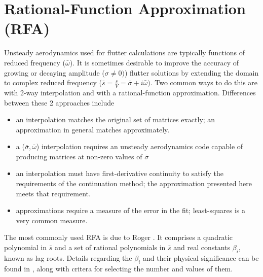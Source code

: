 \documentclass[10pt,openany,twoside]{book}
\numberwithin{equation}{section}   %
\begin{document}
\newpage
\section{Rational-Function Approximation (RFA)}\label{chap:RFA}
Unsteady aerodynamics used for flutter calculations are typically
functions of reduced frequency ($\bar{\omega}$). It is sometimes desirable
to improve the accuracy of growing or decaying amplitude ($\sigma \ne 0)$)
flutter solutions by extending the domain to complex reduced frequency
($\bar{s} = \frac{s}{V} = \bar{\sigma} + i\bar{\omega})$.
Two common ways to do this are with 2-way interpolation and
with a rational-function approximation. Differences between
these 2 approaches include
\begin{itemize}
	\item an interpolation matches the original set of matrices
		exactly; an approximation in general matches approximately.
	\item a ($\bar{\sigma}, \bar{\omega}$) interpolation requires
		an unsteady aerodynamics code capable of producing matrices
		at non-zero values of $\bar{\sigma}$ \cite{edwards2008flutter}
	\item an interpolation must have first-derivative continuity
		to satisfy the requirements of the continuation method; the
		approximation presented here meets that requirement.
	\item approximations require a measure of the error in the
		fit; least-squares is a very common measure.
\end{itemize}

The most commonly used RFA is due to Roger \cite{roger1977airplane}.
It comprises a quadratic polynomial in $\bar{s}$ and a set of rational
polynomials in $\bar{s}$ and real constants $\beta_i$, known as
lag roots. Details regarding the $\beta_i$ and their physical
significance can be found in \cite{demasi2024introduction}, along
with critera for selecting the number and values of them.
\end{document}
